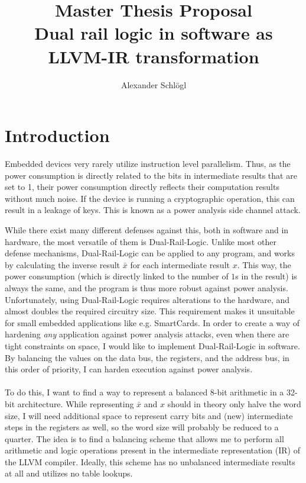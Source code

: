 \documentclass{article}
\title{%
  Master Thesis Proposal\\
  \large Dual rail logic in software as LLVM-IR transformation}
\author{Alexander Schl\"ogl}
\newcommand{\dual}{Dual-Rail-Logic}
\newcommand{\llvm}{LLVM}
\begin{document}
\maketitle

\section{Introduction}
Embedded devices very rarely utilize instruction level parallelism.
Thus, as the power consumption is directly related to the bits in intermediate results that are set to 1, their power consumption directly reflects their computation results without much noise.
If the device is running a cryptographic operation, this can result in a leakage of keys.
This is known as a power analysis side channel attack\cite{kocher1999differential}.

While there exist many different defenses against this, both in software and in hardware, the most versatile of them is \dual{}\cite{sokolov2005design}.
Unlike most other defense mechanisms, \dual{} can be applied to any program, and works by calculating the inverse result $\bar{x}$ for each intermediate result $x$.
This way, the power consumption (which is directly linked to the number of $1$s in the result) is always the same, and the program is thus more robust against power analysis.
Unfortunately, using \dual{} requires alterations to the hardware, and almost doubles the required circuitry size.
This requirement makes it unsuitable for small embedded applications like e.g. SmartCards.
In order to create a way of hardening \emph{any} application against power analysis attacks, even when there are tight constraints on space, I would like to implement \dual{} in software.
By balancing the values on the data bus, the registers, and the address bus, in this order of priority, I can harden execution against power analysis.
\\
\\
To do this, I want to find a way to represent a balanced 8-bit arithmetic in a 32-bit architecture.
While representing $\bar{x}$ and $x$ should in theory only halve the word size, I will need additional space to represent carry bits and (new) intermediate steps in the registers as well, so the word size will probably be reduced to a quarter.
The idea is to find a balancing scheme that allows me to perform all arithmetic and logic operations present in the intermediate representation (IR) of the \llvm{} compiler.
Ideally, this scheme has no unbalanced intermediate results at all and utilizes no table lookups.
\end{document}
